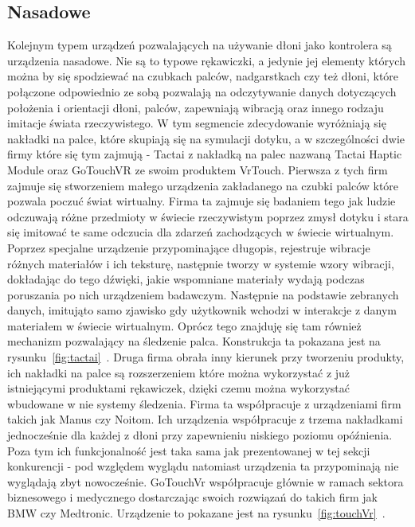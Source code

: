 	\subsection{Nasadowe}
	\label{subsec:nasadowe}
	Kolejnym typem urządzeń pozwalających na używanie dłoni jako kontrolera są urządzenia nasadowe. Nie są to typowe rękawiczki, a jedynie jej elementy których można by się spodziewać na czubkach palców, nadgarstkach czy też dłoni, które połączone odpowiednio ze sobą pozwalają na odczytywanie danych dotyczących położenia i orientacji  dłoni, palców, zapewniają wibracją oraz innego rodzaju imitacje świata rzeczywistego. W tym segmencie zdecydowanie wyróżniają się nakładki na palce, które skupiają się na symulacji dotyku, a w szczególności dwie firmy które się tym zajmują - Tactai z nakładką na palec nazwaną Tactai Haptic Module oraz GoTouchVR ze swoim produktem VrTouch. Pierwsza z tych firm zajmuje się stworzeniem małego urządzenia zakładanego na czubki palców które pozwala poczuć świat wirtualny. Firma ta zajmuje się badaniem tego jak ludzie odczuwają różne przedmioty w świecie rzeczywistym poprzez zmysł dotyku i stara się imitować te same odczucia dla zdarzeń zachodzących w świecie wirtualnym. Poprzez specjalne urządzenie przypominające długopis, rejestruje wibracje różnych materiałów i ich teksturę, następnie tworzy w systemie wzory wibracji, dokładając do tego dźwięki, jakie wspomniane materiały wydają podczas poruszania po nich urządzeniem badawczym. Następnie na podstawie zebranych danych, imitująto samo zjawisko gdy użytkownik wchodzi w interakcje z danym materiałem  w świecie wirtualnym. Oprócz tego znajduję się tam również mechanizm pozwalający na śledzenie palca. Konstrukcja ta pokazana jest na rysunku~\ref{fig:tactai}~\cite{tactai}. Druga firma obrała inny kierunek przy tworzeniu produkty, ich nakładki na palce są rozszerzeniem które można wykorzystać z już istniejącymi produktami rękawiczek, dzięki czemu można wykorzystać wbudowane w nie systemy śledzenia. Firma ta współpracuje z urządzeniami firm takich jak Manus czy Noitom. Ich urządzenia współpracuje z trzema nakładkami jednocześnie dla każdej z dłoni przy zapewnieniu niskiego poziomu opóźnienia. Poza tym ich funkcjonalność jest taka sama jak prezentowanej w tej sekcji konkurencji - pod względem wyglądu natomiast urządzenia ta przypominają nie wyglądają zbyt nowocześnie. GoTouchVr współpracuje głównie w ramach sektora biznesowego i medycznego dostarczając swoich rozwiązań do takich firm jak BMW czy Medtronic. Urządzenie to pokazane jest na rysunku~\ref{fig:touchVr}~\cite{touchVr}.

